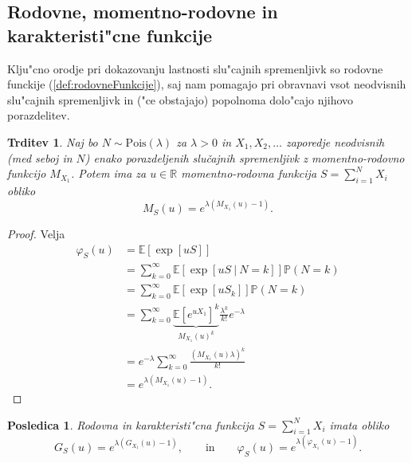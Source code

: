 \documentclass[12pt, a4paper, reqno]{amsart}
\theoremstyle{definition}
\theoremstyle{plain}
\newtheorem{trditev}[definicija]{Trditev}
\newtheorem{posledica}[definicija]{Posledica}
\newcommand{\R}{\mathbb{R}}
\newcommand{\E}{\mathbb{E}}
\newcommand{\Prob}{\mathbb{P}}
\newcommand{\1}{\mathds{1}}
\newcommand{\Pois}[1]{\text{Pois}(#1)}
\begin{document}
    \subsection{Rodovne, momentno-rodovne in karakteristi"cne funkcije} Klju"cno \newline orodje pri dokazovanju
    lastnosti slu"cajnih spremenljivk so rodovne funckije (\ref{def:rodovneFunkcije}), saj nam pomagajo
    pri obravnavi vsot neodvisnih slu"cajnih spremenljivk in ("ce obstajajo) popolnoma dolo"cajo njihovo porazdelitev.  

    \begin{trditev}
        Naj bo $N\sim \Pois{\lambda}$  za $\lambda >0$ in $X_1, X_2, \dots$ zaporedje neodvisnih (med seboj in $N$)
        enako porazdeljenih slučajnih spremenljivk z momentno-rodovno funkcijo $M_{X_1}$. Potem ima za $u\in\R$
        momentno-rodovna funkcija $S = \sum_{i=1}^NX_i$ obliko
        \begin{equation*}
            M_{S}(u) = e^{\lambda \left(M_{X_1}(u) - 1\right)}.
        \end{equation*}
        \label{trd:MomentGener}
    \end{trditev}
    
    \begin{proof}
        Velja
        \begin{align}
            \varphi_{S}(u) 
                    &= \E\left[\exp\left[uS\right]\right] \nonumber\\
                    &= \sum_{k=0}^{\infty}
                        \E\left[\exp\left[uS \ \big| \ N=k\right]\right]\Prob\left(N = k\right) \nonumber \\ 
                    &= \sum_{k=0}^{\infty}
                        \E\left[\exp\left[uS_k\right]\right]\Prob\left(N = k\right) \nonumber \\
                    &= \sum_{k=0}^{\infty}
                        \underbrace{\E\left[e^{uX_1}\right]^k}_{M_{X_1}(u)^k}\frac{\lambda^k}{k!}e^{-\lambda } \label{eq:MomentS}\\ 
                    &= e^{-\lambda }\sum_{k=0}^\infty\frac{\left(M_{X_1}(u)\lambda \right)^k}{k!} \nonumber \\
                    &= e^{\lambda \left(M_{X_1}(u) - 1\right)}. \nonumber
        \end{align}
    \end{proof}
    
    \begin{posledica}
        Rodovna in karakteristi"cna funkcija $S=\sum_{i = 1}^{N}X_i$ imata obliko 
    \begin{equation*}
        G_{S}(u) = e^{\lambda \left(G_{X_1}(u) - 1\right)}, \qquad \text{in} \qquad
        \varphi_{S}(u) = e^{\lambda \left(\varphi_{X_1}(u) - 1\right)}.
    \end{equation*}
    \end{posledica}
\end{document}
